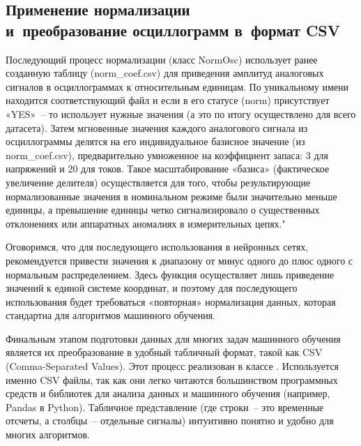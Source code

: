 \subsection[Применение нормализации и преобразование осциллограмм в формат CSV]{Применение нормализации\\ и~преобразование осциллограмм в~формат CSV}\label{sec:ch3_csv_transformation}

Последующий процесс нормализации (класс NormOsc) использует ранее созданную таблицу
(norm\_coef.csv) для приведения амплитуд аналоговых сигналов в осциллограммах к
относительным единицам. По уникальному имени находится соответствующий файл и если в его
статусе (norm) присутствует «YES»~-- то использует нужные значения (а это по итогу
осуществлено для всего датасета). Затем мгновенные значения каждого аналогового сигнала
из осциллограммы делятся на его индивидуальное базисное значение (из norm\_coef.csv),
предварительно умноженное на коэффициент запаса: 3 для напряжений и 20 для токов. Такое
масштабирование «базиса» (фактическое увеличение делителя) осуществляется для того,
чтобы результирующие нормализованные значения в номинальном режиме были значительно
меньше единицы, а превышение единицы четко сигнализировало о существенных отклонениях
или аппаратных аномалиях в измерительных цепях."

Оговоримся, что для последующего использования в нейронных сетях, рекомендуется привести
значения к диапазону от минус одного до плюс одного с нормальным распределением. Здесь
функция осуществляет лишь приведение значений к единой системе координат, и поэтому для
последующего использования будет требоваться «повторная» нормализация данных, которая
стандартна для алгоритмов машинного обучения.

Финальным этапом подготовки данных для многих задач машинного обучения является их преобразование в удобный табличный формат, такой как CSV (Comma-Separated Values). Этот процесс реализован в классе . Используется именно CSV файлы, так как они легко читаются большинством программных средств и библиотек для анализа данных и машинного обучения (например, Pandas в Python). Табличное представление (где строки~-- это временные отсчеты, а столбцы~-- отдельные сигналы) интуитивно понятно и удобно для многих алгоритмов.

